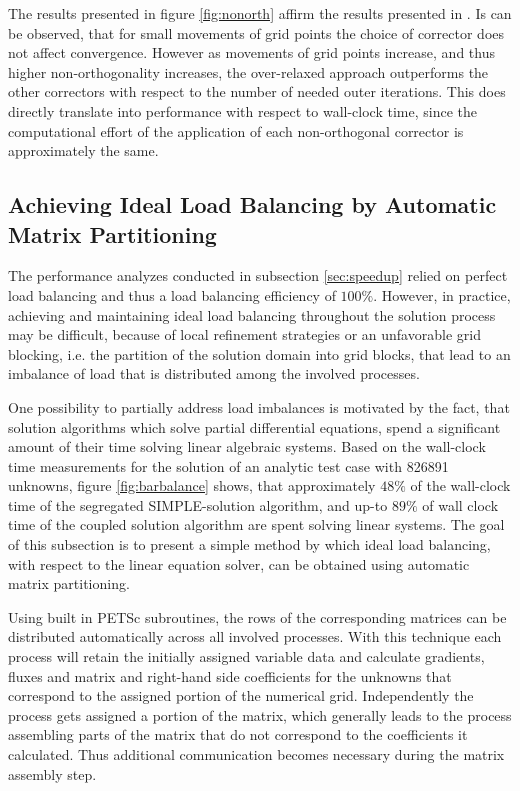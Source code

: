 The results presented in figure \ref{fig:nonorth} affirm the results presented in \cite{jasak96}. Is can be observed, that for small movements of grid points the choice of corrector does not affect convergence. However as movements of grid points increase, and thus higher non-orthogonality increases, the over-relaxed approach outperforms the other correctors with respect to the number of needed outer iterations. This does directly translate into performance with respect to wall-clock time, since the computational effort of the application of each non-orthogonal corrector is approximately the same.

\subsection{Achieving Ideal Load Balancing by Automatic Matrix Partitioning}

The performance analyzes conducted in subsection \ref{sec:speedup} relied on perfect load balancing and thus a load balancing efficiency of \(100\%\). However, in practice, achieving and maintaining ideal load balancing throughout the solution process may be difficult, because of local refinement strategies or an unfavorable grid blocking, i.e. the partition of the solution domain into grid blocks, that lead to an imbalance of load that is distributed among the involved processes. 

One possibility to partially address load imbalances is motivated by the fact, that solution algorithms which solve partial differential equations, spend a significant amount of their time solving linear algebraic systems. Based on the wall-clock time measurements for the solution of an analytic test case with 826891 unknowns, figure \ref{fig:barbalance} shows, that approximately \(48\%\) of the wall-clock time of the segregated SIMPLE-solution algorithm, and up-to \(89\%\) of wall clock time of the coupled solution algorithm are spent solving linear systems. The goal of this subsection is to present a simple method by which ideal load balancing, with respect to the linear equation solver, can be obtained using automatic matrix partitioning.

Using built in PETSc subroutines, the rows of the corresponding matrices can be distributed automatically across all involved processes. With this technique each process will retain the initially assigned variable data and calculate gradients, fluxes and matrix and right-hand side coefficients for the unknowns that correspond to the assigned portion of the numerical grid. Independently the process gets assigned a portion of the matrix, which generally leads to the process assembling parts of the matrix that do not correspond to the coefficients it calculated. Thus additional communication becomes necessary during the matrix assembly step.


